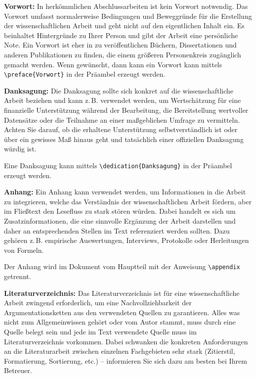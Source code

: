 	
\textbf{Vorwort:}\label{itm:preface}
In herkömmlichen Abschlussarbeiten ist kein Vorwort notwendig. Das Vorwort umfasst normalerweise Bedingungen und Beweggründe für die Erstellung der wissenschaftlichen Arbeit und geht nicht auf den eigentlichen Inhalt ein. Es beinhaltet Hintergründe zu Ihrer Person und gibt der Arbeit eine persönliche Note. Ein Vorwort ist eher in zu veröffentlichen Büchern, Dissertationen und anderen Publikationen zu finden, die einem größeren Personenkreis zugänglich gemacht werden. Wenn gewünscht, dann kann ein Vorwort kann mittels \verb|\preface{Vorwort}| in der Präambel erzeugt werden.
	
\textbf{Danksagung:}\label{itm:dedication}
Die Danksagung sollte sich konkret auf die wissenschaftliche Arbeit beziehen und kann z.\,B. verwendet werden, um Wertschätzung für eine finanzielle Unterstützung während der Bearbeitung, die Bereitstellung wertvoller Datensätze oder die Teilnahme an einer maßgeblichen Umfrage zu vermitteln. Achten Sie darauf, ob die erhaltene Unterstützung selbstverständlich ist oder über ein gewisses Maß hinaus geht und tatsächlich einer offiziellen Danksagung würdig ist.

Eine Danksagung kann mittels \verb|\dedication{Danksagung}| in der Präambel erzeugt werden.
	
\textbf{Anhang:}\label{itm:appendix}
Ein Anhang kann verwendet werden, um Informationen in die Arbeit zu integrieren, welche das Verständnis der wissenschaftlichen Arbeit fördern, aber im Fließtext den Lesefluss zu stark stören würden. Dabei handelt es sich um Zusatzinformationen, die eine sinnvolle Ergänzung der Arbeit darstellen und daher an entsprechenden Stellen im Text referenziert werden sollten.
Dazu gehören z.\,B. empirische Auswertungen, Interviews, Protokolle oder Herleitungen von Formeln.

Der Anhang wird im Dokument vom Hauptteil mit der Anweisung \verb|\appendix| getrennt.
	
	
\textbf{Literaturverzeichnis:}\label{itm:bibliography}
Das Literaturverzeichnis ist für eine wissenschaftliche Arbeit zwingend erforderlich, um eine Nachvollziehbarkeit der Argumentationsketten aus den verwendeten Quellen zu garantieren. Alles was nicht zum Allgemeinwissen gehört oder vom Autor stammt, muss durch eine Quelle belegt sein und jede im Text verwendete Quelle muss im Literaturverzeichnis vorkommen. Dabei schwanken die konkreten Anforderungen an die Literaturarbeit zwischen einzelnen Fachgebieten sehr stark (Zitierstil, Formatierung, Sortierung, etc.) -- informieren Sie sich dazu am besten bei Ihrem Betreuer.

